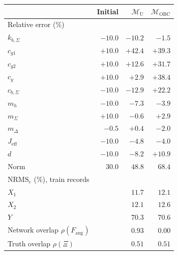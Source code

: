\setlength{\tabcolsep}{4pt}
\begin{tabular}{l r r r}
\toprule
 & Initial & $\mathcal{M}_{\mathrm{U}}$ & $\mathcal{M}_{\mathrm{OBC}}$\\
\midrule
\multicolumn{4}{l}{Relative error (\%)}\\
$k_{b,\Sigma}$ & $-10.0$ & $-10.2$ & $-1.5$\\
$c_{g1}$ & $+10.0$ & $+42.4$ & $+39.3$\\
$c_{g2}$ & $+10.0$ & $+12.6$ & $+31.7$\\
$c_y$ & $+10.0$ & $+2.9$ & $+38.4$\\
$c_{b,\Sigma}$ & $-10.0$ & $-12.9$ & $+22.2$\\
$m_h$ & $-10.0$ & $-7.3$ & $-3.9$\\
$m_\Sigma$ & $+10.0$ & $-0.6$ & $+2.9$\\
$m_\Delta$ & $-0.5$ & $+0.4$ & $-2.0$\\
$J_{\mathrm{eff}}$ & $-10.0$ & $-4.8$ & $-4.0$\\
$d$ & $-10.0$ & $-8.2$ & $+10.9$\\
Norm & $30.0$ & $48.8$ & $68.4$\\
\midrule
\multicolumn{4}{l}{$\mathrm{NRMS}_e$ (\%), train records}\\
$X_1$ &  & $11.7$ & $12.1$\\
$X_2$ &  & $12.1$ & $12.6$\\
$Y$ &  & $70.3$ & $70.6$\\
\midrule
Network overlap $\rho(F_{\mathrm{aug}})$ &  & $0.93$ & $0.00$\\
Truth overlap $\rho(\Xi)$ &  & $0.51$ & $0.51$\\
\bottomrule
\end{tabular}
